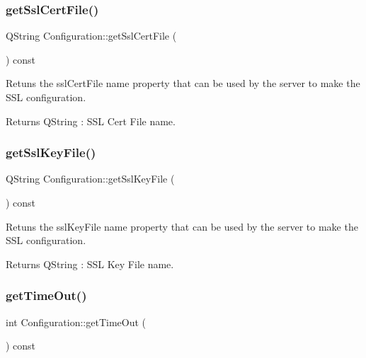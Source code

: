 \subsubsection{\texorpdfstring{get\+Ssl\+Cert\+File()}{getSslCertFile()}}
{\footnotesize\ttfamily Q\+String Configuration\+::get\+Ssl\+Cert\+File (\begin{DoxyParamCaption}{ }\end{DoxyParamCaption}) const}



Retuns the ssl\+Cert\+File name property that can be used by the server to make the S\+SL configuration. 

\begin{DoxyReturn}{Returns}
Q\+String \+: S\+SL Cert File name. 
\end{DoxyReturn}
\mbox{\label{class_configuration_a96082bdd3333d8ddf2017a95fe302225}} 
\subsubsection{\texorpdfstring{get\+Ssl\+Key\+File()}{getSslKeyFile()}}
{\footnotesize\ttfamily Q\+String Configuration\+::get\+Ssl\+Key\+File (\begin{DoxyParamCaption}{ }\end{DoxyParamCaption}) const}



Retuns the ssl\+Key\+File name property that can be used by the server to make the S\+SL configuration. 

\begin{DoxyReturn}{Returns}
Q\+String \+: S\+SL Key File name. 
\end{DoxyReturn}
\mbox{\label{class_configuration_a3cd126ebe20117c04b4d38797e06551d}} 
\subsubsection{\texorpdfstring{get\+Time\+Out()}{getTimeOut()}}
{\footnotesize\ttfamily int Configuration\+::get\+Time\+Out (\begin{DoxyParamCaption}{ }\end{DoxyParamCaption}) const}



